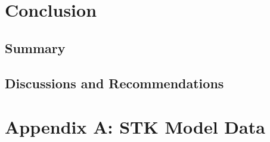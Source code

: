 \documentclass{ece}
\begin{document}
\section{Conclusion}
\subsection{Summary}
\subsection{Discussions and Recommendations}

\pagebreak
%   
%
%
%
%
\printbibliography[heading=none]

\section{Appendix A: STK Model Data}
\end{document}
